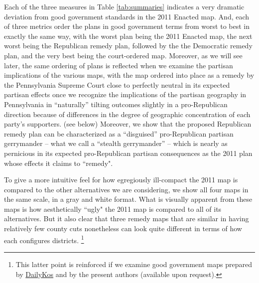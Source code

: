 \par
    Each of the three measures in Table \ref{tab:summaries} indicates a very dramatic deviation from good government standards in the 2011 Enacted map. And, each of three metrics order the plans in good government terms from worst to best in exactly the same way, with the worst plan being the 2011 Enacted map, the next worst being the Republican remedy plan, followed by the the Democratic remedy plan, and the very best being the court-ordered map. Moreover, as we will see later, the same ordering of plans is reflected when we examine the partisan implications of the various maps, with the map ordered into place as a remedy by the Pennsylvania Supreme Court close to perfectly neutral in its expected partisan effects once we recognize the implications of the partisan geography in Pennsylvania in ``naturally” tilting outcomes slightly in a pro-Republican direction because of differences in the degree of geographic concentration of each party’s supporters. (see below) Moreover, we show that the proposed Republican remedy plan can be characterized as a ``disguised” pro-Republican partisan gerrymander -- what we call a ``stealth gerrymander” -- which is nearly as pernicious in its expected pro-Republican partisan consequences as the 2011 plan whose effects it claims to ``remedy".
\par
    To give a more intuitive feel for how egregiously ill-compact the 2011 map is compared to the other alternatives we are considering, we show all four maps in the same scale, in a gray and white format. What is visually apparent from these maps is how aesthetically ``ugly" the 2011 map is compared to all of its alternatives. But it also clear that three remedy maps that are similar in having relatively few county cuts nonetheless can look quite different in terms of how each configures districts.
    \footnote{This latter point is reinforced if we examine good government maps prepared by \href{https://www.dailykos.com/stories/2018/2/8/1739648/-Pennsylvania-will-soon-redraw-its-House-map-to-end-GOP-gerrymandering-How-would-you-draw-the-lines}{DailyKos} and by the present authors (available upon request).}
